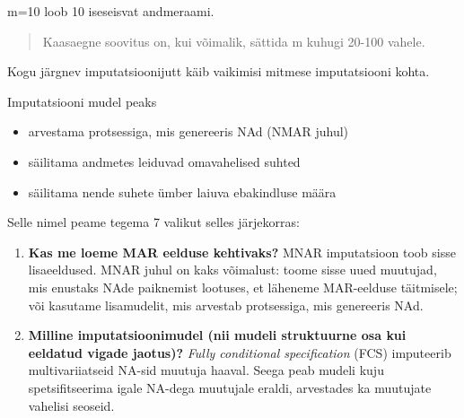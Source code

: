 \documentclass[]{book}
\newenvironment{Shaded}{\begin{snugshade}}{\end{snugshade}}
\newcommand{\KeywordTok}[1]{\textcolor[rgb]{0.13,0.29,0.53}{\textbf{#1}}}
\newcommand{\DataTypeTok}[1]{\textcolor[rgb]{0.13,0.29,0.53}{#1}}
\newcommand{\DecValTok}[1]{\textcolor[rgb]{0.00,0.00,0.81}{#1}}
\newcommand{\StringTok}[1]{\textcolor[rgb]{0.31,0.60,0.02}{#1}}
\newcommand{\CommentTok}[1]{\textcolor[rgb]{0.56,0.35,0.01}{\textit{#1}}}
\newcommand{\OtherTok}[1]{\textcolor[rgb]{0.56,0.35,0.01}{#1}}
\newcommand{\OperatorTok}[1]{\textcolor[rgb]{0.81,0.36,0.00}{\textbf{#1}}}
\newcommand{\NormalTok}[1]{#1}
\begin{document}
\begin{Shaded}
\end{Shaded}

m=10 loob 10 iseseisvat andmeraami.

\begin{quote}
Kaasaegne soovitus on, kui võimalik, sättida m kuhugi 20-100 vahele.
\end{quote}

Kogu järgnev imputatsioonijutt käib vaikimisi mitmese imputatsiooni
kohta.

Imputatsiooni mudel peaks

\begin{itemize}
\item
  arvestama protsessiga, mis genereeris NAd (NMAR juhul)
\item
  säilitama andmetes leiduvad omavahelised suhted
\item
  säilitama nende suhete ümber laiuva ebakindluse määra
\end{itemize}

Selle nimel peame tegema 7 valikut selles järjekorras:

\begin{enumerate}
\def\labelenumi{\arabic{enumi}.}
\item
  \textbf{Kas me loeme MAR eelduse kehtivaks?} MNAR imputatsioon toob
  sisse lisaeeldused. MNAR juhul on kaks võimalust: toome sisse uued
  muutujad, mis enustaks NAde paiknemist lootuses, et läheneme
  MAR-eelduse täitmisele; või kasutame lisamudelit, mis arvestab
  protsessiga, mis genereeris NAd.
\item
  \textbf{Milline imputatsioonimudel (nii mudeli struktuurne osa kui
  eeldatud vigade jaotus)?} \emph{Fully conditional specification} (FCS)
  imputeerib multivariiatseid NA-sid muutuja haaval. Seega peab mudeli
  kuju spetsifitseerima igale NA-dega muutujale eraldi, arvestades ka
  muutujate vahelisi seoseid.
\end{enumerate}
\end{document}
